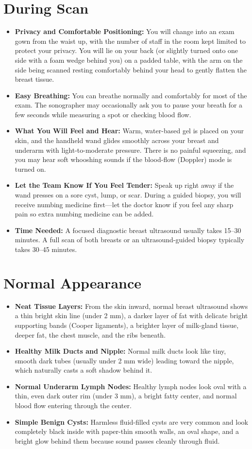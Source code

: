 \section{During Scan}
\begin{itemize}
\item \textbf{Privacy and Comfortable Positioning:} You will change into an exam gown from the waist up, with the number of staff in the room kept limited to protect your privacy. You will lie on your back (or slightly turned onto one side with a foam wedge behind you) on a padded table, with the arm on the side being scanned resting comfortably behind your head to gently flatten the breast tissue.
\item \textbf{Easy Breathing:} You can breathe normally and comfortably for most of the exam. The sonographer may occasionally ask you to pause your breath for a few seconds while measuring a spot or checking blood flow.
\item \textbf{What You Will Feel and Hear:} Warm, water-based gel is placed on your skin, and the handheld wand glides smoothly across your breast and underarm with light-to-moderate pressure. There is no painful squeezing, and you may hear soft whooshing sounds if the blood-flow (Doppler) mode is turned on.
\item \textbf{Let the Team Know If You Feel Tender:} Speak up right away if the wand presses on a sore cyst, lump, or scar. During a guided biopsy, you will receive numbing medicine first---let the doctor know if you feel any sharp pain so extra numbing medicine can be added.
\item \textbf{Time Needed:} A focused diagnostic breast ultrasound usually takes 15--30 minutes. A full scan of both breasts or an ultrasound-guided biopsy typically takes 30--45 minutes.
\end{itemize}

\section{Normal Appearance}
\begin{itemize}
\item \textbf{Neat Tissue Layers:} From the skin inward, normal breast ultrasound shows a thin bright skin line (under 2 mm), a darker layer of fat with delicate bright supporting bands (Cooper ligaments), a brighter layer of milk-gland tissue, deeper fat, the chest muscle, and the ribs beneath.
\item \textbf{Healthy Milk Ducts and Nipple:} Normal milk ducts look like tiny, smooth dark tubes (usually under 2 mm wide) leading toward the nipple, which naturally casts a soft shadow behind it.
\item \textbf{Normal Underarm Lymph Nodes:} Healthy lymph nodes look oval with a thin, even dark outer rim (under 3 mm), a bright fatty center, and normal blood flow entering through the center.
\item \textbf{Simple Benign Cysts:} Harmless fluid-filled cysts are very common and look completely black inside with paper-thin smooth walls, an oval shape, and a bright glow behind them because sound passes cleanly through fluid.
\end{itemize}

